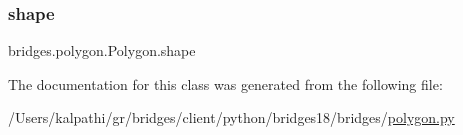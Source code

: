 \mbox{\label{classbridges_1_1polygon_1_1_polygon_a6e441d7a6962358a2d0ee6aec7312635}} 
\subsubsection{\texorpdfstring{shape}{shape}}
{\footnotesize\ttfamily bridges.\+polygon.\+Polygon.\+shape}



The documentation for this class was generated from the following file\+:\begin{DoxyCompactItemize}
\item 
/\+Users/kalpathi/gr/bridges/client/python/bridges18/bridges/\mbox{\hyperlink{polygon_8py}{polygon.\+py}}\end{DoxyCompactItemize}
